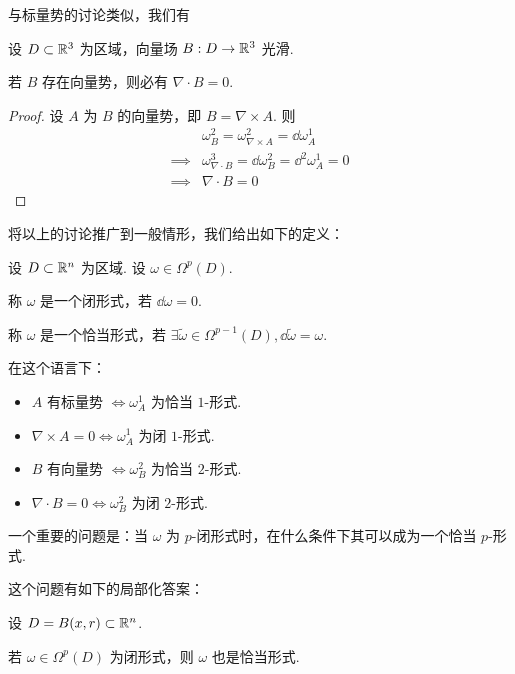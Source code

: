 与标量势的讨论类似，我们有

\begin{property}
    设 $D\subset\mathbb{R}^3$ 为区域，向量场 $B:D\to\mathbb{R}^3$ 光滑.

    若 $B$ 存在向量势，则必有 $\nabla\cdot B=0$.
\end{property}
\begin{proof}
    设 $A$ 为 $B$ 的向量势，即 $B=\nabla\times A$. 则
$$
\begin{aligned}
    &\omega_B^2=\omega_{\nabla\times A}^2=\dd\omega_A^1\\
    \implies&\omega_{\nabla\cdot B}^3=\dd\omega_B^2=\dd^2\omega_A^1=0\\
    \implies&\nabla\cdot B=0
\end{aligned}
$$
\end{proof}

将以上的讨论推广到一般情形，我们给出如下的定义：

\begin{definition}
    设 $D\subset\mathbb{R}^n$ 为区域. 设 $\omega\in\Omega^p(D)$.

    称 $\omega$ 是一个闭形式，若 $\dd\omega=0$.

    称 $\omega$ 是一个恰当形式，若 $\exists\widetilde{\omega}\in\Omega^{p-1}(D),\dd\widetilde{\omega}=\omega$.
\end{definition}

在这个语言下：

\begin{itemize}
    \item $A$ 有标量势 $\iff\omega_A^1$ 为恰当 $1$-形式.
    
    \item $\nabla\times A=0\iff\omega_A^1$ 为闭 $1$-形式.
    
    \item $B$ 有向量势 $\iff\omega_B^2$ 为恰当 $2$-形式.
    
    \item $\nabla\cdot B=0\iff\omega_B^2$ 为闭 $2$-形式.
\end{itemize}

一个重要的问题是：当 $\omega$ 为 $p$-闭形式时，在什么条件下其可以成为一个恰当 $p$-形式.

这个问题有如下的局部化答案：

\begin{theorem}[Poincaré]
    设 $D=B(x,r)\subset\mathbb{R}^n$.

    若 $\omega\in\Omega^p(D)$ 为闭形式，则 $\omega$ 也是恰当形式.
\end{theorem}

